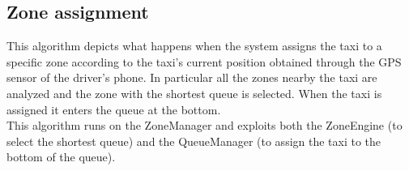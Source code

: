 \documentclass[a4paper,11pt]{report} %
\begin{document}
	\pagebreak
	
	\subsection{Zone assignment}
	This algorithm depicts what happens when the system assigns the taxi to a specific zone according to the taxi's current position obtained through the GPS sensor of the driver's phone. In particular all the zones nearby the taxi are analyzed and the zone with the shortest queue is selected. When the taxi is assigned it enters the queue at the bottom.\\
	This algorithm runs on the ZoneManager and exploits both the ZoneEngine (to select the shortest queue) and the QueueManager (to assign the taxi to the bottom of the queue).\\
	
\end{document}
